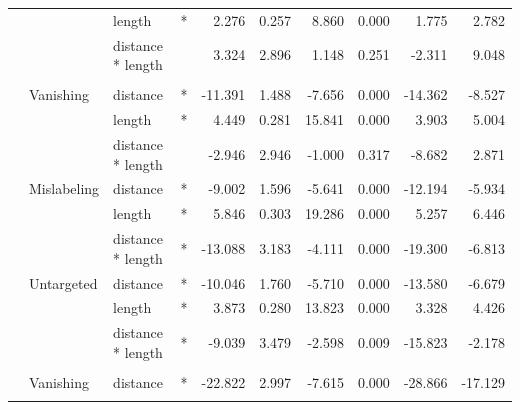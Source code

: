 \begin{longtable}[t]{llllrrrrrr}
\cmidrule{3-10}\nopagebreak
\hspace{1em} &  & length & * & 2.276 & 0.257 & 8.860 & 0.000 & 1.775 & 2.782\\
\cmidrule{3-10}\nopagebreak
\hspace{1em} &  & distance * length &  & 3.324 & 2.896 & 1.148 & 0.251 & -2.311 & 9.048\\
\cmidrule{1-10}\pagebreak[0]
\addlinespace[0.3em]
\multicolumn{10}{l}{\textbf{SSD}}\\
\hspace{1em} & Vanishing & distance & * & -11.391 & 1.488 & -7.656 & 0.000 & -14.362 & -8.527\\
\cmidrule{3-10}\nopagebreak
\hspace{1em} &  & length & * & 4.449 & 0.281 & 15.841 & 0.000 & 3.903 & 5.004\\
\cmidrule{3-10}\nopagebreak
\hspace{1em} &  & distance * length &  & -2.946 & 2.946 & -1.000 & 0.317 & -8.682 & 2.871\\
\cmidrule{2-10}\nopagebreak
\hspace{1em} & Mislabeling & distance & * & -9.002 & 1.596 & -5.641 & 0.000 & -12.194 & -5.934\\
\cmidrule{3-10}\nopagebreak
\hspace{1em} &  & length & * & 5.846 & 0.303 & 19.286 & 0.000 & 5.257 & 6.446\\
\cmidrule{3-10}\nopagebreak
\hspace{1em} &  & distance * length & * & -13.088 & 3.183 & -4.111 & 0.000 & -19.300 & -6.813\\
\cmidrule{2-10}\nopagebreak
\hspace{1em} & Untargeted & distance & * & -10.046 & 1.760 & -5.710 & 0.000 & -13.580 & -6.679\\
\cmidrule{3-10}\nopagebreak
\hspace{1em} &  & length & * & 3.873 & 0.280 & 13.823 & 0.000 & 3.328 & 4.426\\
\cmidrule{3-10}\nopagebreak
\hspace{1em} &  & distance * length & * & -9.039 & 3.479 & -2.598 & 0.009 & -15.823 & -2.178\\
\cmidrule{1-10}\pagebreak[0]
\addlinespace[0.3em]
\multicolumn{10}{l}{\textbf{RetinaNet}}\\
\hspace{1em} & Vanishing & distance & * & -22.822 & 2.997 & -7.615 & 0.000 & -28.866 & -17.129\\
\cmidrule{3-10}\nopagebreak

\end{longtable}
